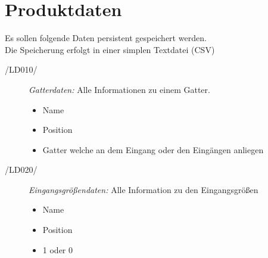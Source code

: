 
\section{Produktdaten}


Es sollen folgende Daten persistent gespeichert werden. \\
Die Speicherung erfolgt in einer simplen Textdatei (\gls{CSV})
\begin{description}
	\item[/LD010/] \textit{Gatterdaten:} Alle Informationen zu einem Gatter.
	\begin{itemize}
		\item Name 
		\item Position 
		\item Gatter welche an dem Eingang oder den Eingängen anliegen 
	\end{itemize}
	
	\item[/LD020/] \textit{Eingangsgrößendaten:} Alle Information zu den Eingangsgrößen
	\begin{itemize}
		\item Name
		\item Position
		\item 1 oder 0
	\end{itemize}
\end{description}